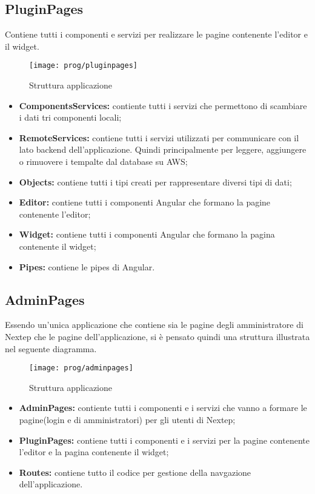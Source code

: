 \subsection{PluginPages}
Contiene tutti i componenti e servizi per realizzare le pagine contenente l'editor e il widget.
\begin{figure}[!h] 
	\centering 
	\texttt{[image: prog/pluginpages]} 
	\caption{Struttura applicazione}
\end{figure}
\begin{itemize}
	\item \textbf{ComponentsServices:} contiente tutti i servizi che permettono di scambiare i dati tri componenti locali;
	\item \textbf{RemoteServices:} contiene tutti i servizi utilizzati per communicare con il lato backend dell'applicazione. Quindi principalmente per leggere, aggiungere o rimuovere i tempalte dal database su AWS;
	\item \textbf{Objects:} contiene tutti i tipi creati per rappresentare diversi tipi di dati;
	\item \textbf{Editor:} contiene tutti i componenti Angular che formano la pagine contenente l'editor;
	\item \textbf{Widget:} contiene tutti i componenti Angular che formano la pagina contenente il widget;
	\item \textbf{Pipes:} contiene le pipes di  Angular.
\end{itemize}
\newpage
\subsection{AdminPages}
Essendo un'unica applicazione che contiene sia le pagine degli amministratore di Nextep che le pagine dell'applicazione, si è pensato quindi una struttura illustrata nel seguente diagramma.
\begin{figure}[!h] 
	\centering 
	\texttt{[image: prog/adminpages]} 
	\caption{Struttura applicazione}
\end{figure}
\begin{itemize}
	\item \textbf{AdminPages:} contiente tutti i componenti e i servizi che vanno a formare le pagine(login e di amministratori) per gli utenti di Nextep;
	\item \textbf{PluginPages:} contiene tutti i componenti e i servizi per la pagine contenente l'editor e la pagina contenente il widget;
	\item \textbf{Routes:} contiene tutto il codice per gestione della navgazione dell'applicazione.
\end{itemize}
